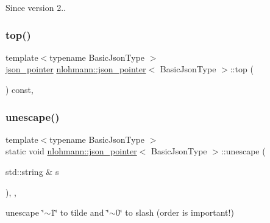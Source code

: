 \begin{DoxySince}{Since}
version 2.. 
\end{DoxySince}
\mbox{\label{classnlohmann_1_1json__pointer_a00eff109d9a0091e42ada9b16b90c8d9}} 
\subsubsection{\texorpdfstring{top()}{top()}}
{\footnotesize\ttfamily template$<$typename Basic\+Json\+Type $>$ \\
\mbox{\hyperlink{classnlohmann_1_1json__pointer}{json\+\_\+pointer}} \mbox{\hyperlink{classnlohmann_1_1json__pointer}{nlohmann\+::json\+\_\+pointer}}$<$ Basic\+Json\+Type $>$\+::top (\begin{DoxyParamCaption}{ }\end{DoxyParamCaption}) const\hspace{0.3cm}{\ttfamily [inline]}, {\ttfamily [private]}}

\mbox{\label{classnlohmann_1_1json__pointer_ab85442d5fbcc289b79beeefc2175446f}} 
\subsubsection{\texorpdfstring{unescape()}{unescape()}}
{\footnotesize\ttfamily template$<$typename Basic\+Json\+Type $>$ \\
static void \mbox{\hyperlink{classnlohmann_1_1json__pointer}{nlohmann\+::json\+\_\+pointer}}$<$ Basic\+Json\+Type $>$\+::unescape (\begin{DoxyParamCaption}\item[{std\+::string \&}]{s }\end{DoxyParamCaption})\hspace{0.3cm}{\ttfamily [inline]}, {\ttfamily [static]}, {\ttfamily [private]}}



unescape \char`\"{}$\sim$1\char`\"{} to tilde and \char`\"{}$\sim$0\char`\"{} to slash (order is important!) 


